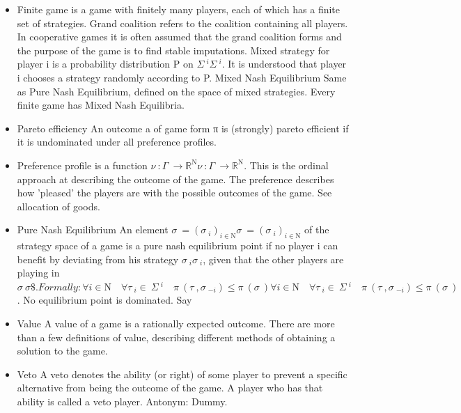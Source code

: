 \documentclass[]{report}
\begin{document}
\begin{itemize}
	\item Finite game 
	is a game with finitely many players, each of which has a finite set of strategies.
	Grand coalition 
	refers to the coalition containing all players. In cooperative games it is often assumed that the grand coalition forms and the purpose of the game is to find stable imputations.
	Mixed strategy 
	for player i is a probability distribution P on ${\displaystyle \Sigma \ ^{i}} \Sigma \ ^{i}$. It is understood that player i chooses a strategy randomly according to P.
	Mixed Nash Equilibrium 
	Same as Pure Nash Equilibrium, defined on the space of mixed strategies. Every finite game has Mixed Nash Equilibria.
	\item Pareto efficiency 
	An outcome a of game form π is (strongly) pareto efficient if it is undominated under all preference profiles.
	\item Preference profile 
	is a function ${\displaystyle \nu \ :\Gamma \ \to \mathbb {R} ^{\mathrm {N} }} \nu \ :\Gamma \ \to \mathbb {R} ^{\mathrm {N} }$. This is the ordinal approach at describing the outcome of the game. The preference describes how 'pleased' the players are with the possible outcomes of the game. See allocation of goods.
	\item Pure Nash Equilibrium 
	An element ${\displaystyle \sigma \ =(\sigma \ _{i})_{i\in \mathrm {N} }} \sigma \ =(\sigma \ _{i})_{i\in \mathrm {N} }$ of the strategy space of a game is a pure nash equilibrium point if no player i can benefit by deviating from his strategy ${\displaystyle \sigma \ _{i}} \sigma \ _{i}$, given that the other players are playing in ${\displaystyle \sigma \ } \sigma \$ . Formally:
	{\displaystyle \forall i\in \mathrm {N} \quad \forall \tau \ _{i}\in \ \Sigma \ ^{i}\quad \pi \ (\tau \ ,\sigma \ _{-i})\leq \pi \ (\sigma \ )} \forall i\in \mathrm {N} \quad \forall \tau \ _{i}\in \ \Sigma \ ^{i}\quad \pi \ (\tau \ ,\sigma \ _{-i})\leq \pi \ (\sigma \ )$.
	No equilibrium point is dominated.
	Say 
	
	\item Value 
	A value of a game is a rationally expected outcome. There are more than a few definitions of value, describing different methods of obtaining a solution to the game.
	\item Veto 
	A veto denotes the ability (or right) of some player to prevent a specific alternative from being the outcome of the game. A player who has that ability is called a veto player.
	Antonym: Dummy.
	

\end{itemize}
\end{document}
